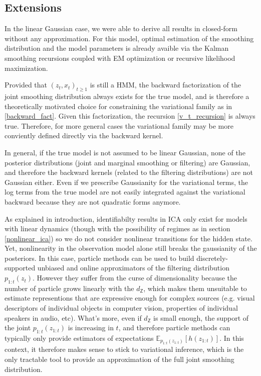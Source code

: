\documentclass{article}
\newcommand{\1}{\mathbbm{1}}
\newcommand{\expect}[2]{\mathbb{E}_{#1}\left[#2\right]}
\begin{document}
\subsection{Extensions}

In the linear Gaussian case, we were able to derive all results in closed-form without any approximation. For this model, optimal estimation of the smoothing distribution and the model parameters is already avaible via the Kalman smoothing recursions coupled with EM optimization or recursive likelihood maximization. 

Provided that $(z_t,x_t)_{t \geq 1}$ is still a HMM, the backward factorization of the joint smoothing distribution always exists for the true model, and is therefore a theoretically motivated choice for constraining the variational family as in \ref{backward_fact}. Given this factorization, the recursion \ref{v_t_recursion} is always true. Therefore, for more general cases the variational family may be more conviently defined directly via the backward kernel. 

In general, if the true model is not assumed to be linear Gaussian, none of the posterior distributions (joint and marginal smoothing or filtering) are Gaussian, and therefore the backward kernels (related to the filtering distributions) are not Gaussian either. Even if we prescribe Gaussianity for the variational terms, the log terms from the true model are not easily integrated against the variational backward because they are not quadratic forms anymore. 

As explained in introduction, identifiabilty results in ICA only exist for models with linear dynamics (though with the possibility of regimes as in section \ref{nonlinear_ica}) so we do not consider nonlinear transitions for the hidden state. Yet, nonlinearity in the observation model alone still breaks the gaussianity of the posteriors. In this case, particle methods can be used to build discretely-supported unbiased and online approximators of the filtering distribution $p_{1:t}(z_t)$. However they suffer from the curse of dimensionality because the number of particle grows linearly with the $d_{\mathsf{Z}}$, which makes them unsuitable to estimate representions that are expressive enough for complex sources (e.g. visual descriptors of individual objects in computer vision, properties of individual speakers in audio, etc). What's more, even if $d_{\mathsf{Z}}$ is small enough, the support of the joint $p_{1:t}(z_{1:t})$ is increasing in $t$, and therefore particle methods can typically only provide estimators of expectations $\expect{p_{1:t}(z_{1:t})}{h(z_{1:t})}$. In this context, it therefore makes sense to stick to variational inference, which is the only tractable tool to provide an approximation of the full joint smoothing distribution. 
\end{document}
